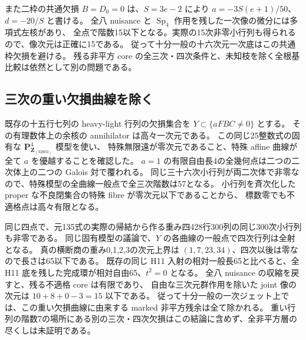 \documentclass[11pt,a4paper]{ltjsarticle}
\newcommand{\PP}{\mathbf P}
\DeclareMathOperator{\Sp}{Sp}
\theoremstyle{remark}
\begin{document}
また二枠の共通欠損 $B=D_0=0$ は、$S=3e-2$ により
$a=-3S(e+1)/50$、$d=-20/S$ と書ける。
全八 nuisance と $\Sp_4$ 作用を残した一次像の微分には多項式左核があり、
全点で階数15以下となる。実際の15次非零小行列も得られるので、像次元は正確に15である。
従って十分一般の十六次元一次底はこの共通枠欠損を避ける\cite{nonsquare-frame-v62}。
残る非平方 core の全三次・四次条件と、未知枝を除く全根基比較は依然として別の問題である。

\subsection{三次の重い欠損曲線を除く}
既存の十五行七列の heavy-light 行列の欠損集合を $Y\subset\{aFBC\ne0\}$ とする。
その有理数体上の余核の annihilator は高々一次元である。
この同じ25整数式の固有な $\PP^4_{\mathbf Z_{(32003)}}$ 模型を使い、
特殊無限遠が零次元であること、特殊 affine 曲線が全て $a$ を優越することを確認した。
$a=1$ の有限自由長4の全幾何点は二つの二次体上の二つの Galois 対で覆われる。
同じ三十六次小行列が両二次体で非零なので、特殊模型の全曲線一般点で全三次階数は57となる。
小行列を斉次化した proper な不良閉集合の特殊 fibre が零次元以下であることから、
標数零でも不適格点は高々有限となる\cite{heavy-defect-v62}。

同じ四点で、元135式の実際の帰結から作る重み四428行300列の同じ300次小行列も非零である。
同じ固有模型の議論で、$Y$ の各曲線の一般点で四次行列は全射となる。
真の横断商の重み0,1,2,3の次元上界は $(1,7,23,34)$、四次以後は零なので長さは65以下である。
既存の同じ H11 入射の相対一般長65と比べると、全 H11 底を残した完成環が相対自由65、$t^2=0$ となる。
全八 nuisance の収縮を戻すと、残る不適格 core は有限であり、
自由な三次元群作用を除いた joint 像の次元は $10+8+0-3=15$ 以下である。
従って十分一般の一次ジェット上では、この重い欠損曲線に由来する marked 非平方残余は全て除かれる。
重い行列の階数7の場所にある別の三次・四次欠損はこの結論に含めず、全非平方層の尽くしは未証明である。
\end{document}
